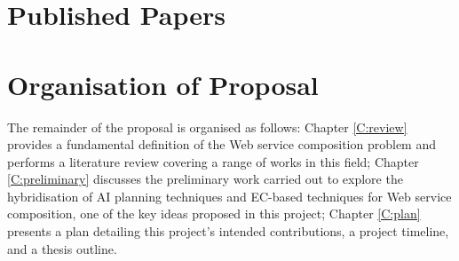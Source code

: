 \section{Published Papers}




\section{Organisation of Proposal}
The remainder of the proposal is organised as follows: Chapter \ref{C:review} provides a fundamental definition of the Web service composition problem and performs a literature review covering a range of works in this field; Chapter \ref{C:preliminary} discusses the preliminary work carried out to explore the hybridisation of AI planning techniques and EC-based techniques for Web service composition, one of the key ideas proposed in this project; Chapter \ref{C:plan} presents a plan detailing this project's intended contributions, a project timeline, and a thesis outline.

